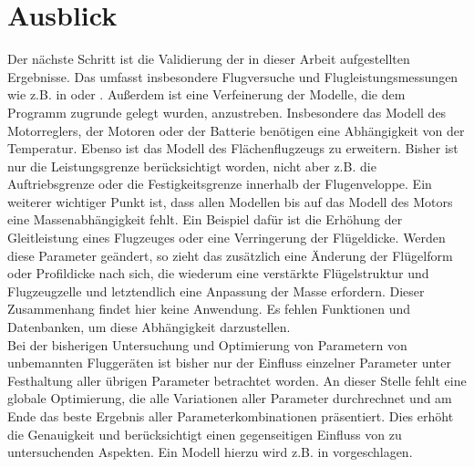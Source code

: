 \section{Ausblick}
Der nächste Schritt ist die Validierung der in dieser Arbeit aufgestellten Ergebnisse. Das umfasst insbesondere Flugversuche und Flugleistungsmessungen wie z.B. in \cite{Ostler.2006} oder \cite{PCUP.2017}.
Außerdem ist eine Verfeinerung der Modelle, die dem Programm zugrunde gelegt wurden, anzustreben. Insbesondere das Modell des Motorreglers, der Motoren oder der Batterie benötigen eine Abhängigkeit von der Temperatur.
Ebenso ist das Modell des Flächenflugzeugs zu erweitern. Bisher ist nur die Leistungsgrenze berücksichtigt worden, nicht aber z.B. die Auftriebsgrenze oder die Festigkeitsgrenze innerhalb der Flugenveloppe. 
Ein weiterer wichtiger Punkt ist, dass allen Modellen bis auf das Modell des Motors eine Massenabhängigkeit fehlt. Ein Beispiel dafür ist die Erhöhung der Gleitleistung eines Flugzeuges oder eine Verringerung der Flügeldicke. Werden diese Parameter geändert, so zieht das zusätzlich eine Änderung der Flügelform oder Profildicke nach sich, die wiederum eine verstärkte Flügelstruktur und Flugzeugzelle und letztendlich eine Anpassung der Masse erfordern. Dieser Zusammenhang findet hier keine Anwendung. Es fehlen Funktionen und Datenbanken, um diese Abhängigkeit darzustellen.\\
Bei der bisherigen Untersuchung und Optimierung von Parametern von unbemannten Fluggeräten ist bisher nur der Einfluss einzelner Parameter unter Festhaltung aller übrigen Parameter betrachtet worden. An dieser Stelle fehlt eine globale Optimierung, die alle Variationen aller Parameter durchrechnet und am Ende das beste Ergebnis aller Parameterkombinationen präsentiert. Dies erhöht die Genauigkeit und berücksichtigt einen gegenseitigen Einfluss von zu untersuchenden Aspekten. Ein Modell hierzu wird z.B. in \cite{Magnussen.2015} vorgeschlagen. 



